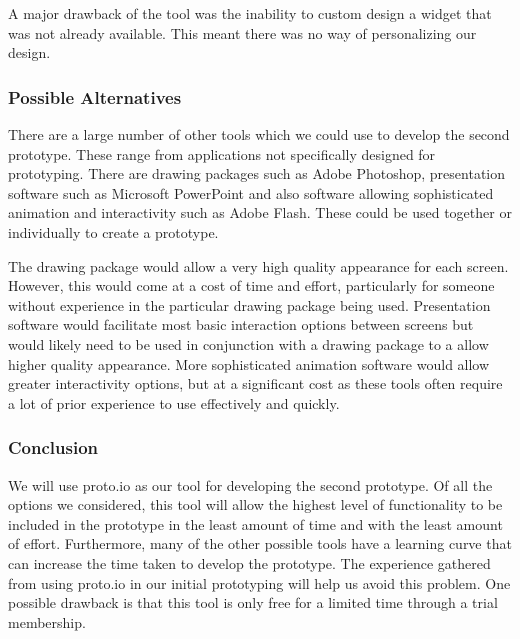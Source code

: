 A major drawback of the tool was the inability to custom design a widget that
was not already available.  This meant there was no way of personalizing our
design.

\subsubsection{Possible Alternatives}

There are a large number of other tools which we could use to develop the
second prototype. These range from applications not specifically designed for
prototyping. There are drawing packages such as Adobe Photoshop, presentation
software such as Microsoft PowerPoint and also software allowing sophisticated
animation and interactivity such as Adobe Flash. These could be used together
or individually to create a prototype.

The drawing package would allow a very high quality appearance for each screen.
However, this would come at a cost of time and effort, particularly for someone
without experience in the particular drawing package being used. Presentation
software would facilitate most basic interaction options between screens but
would likely need to be used in conjunction with a drawing package to a allow
higher quality appearance. More sophisticated animation software would allow
greater interactivity options, but at a significant cost as these tools often
require a lot of prior experience to use effectively and quickly.

\subsubsection{Conclusion}

We will use proto.io as our tool for developing the second prototype. Of all
the options we considered, this tool will allow the highest level of
functionality to be included in the prototype in the least amount of time and
with the least amount of effort. Furthermore, many of the other possible tools
have a learning curve that can increase the time taken to develop the
prototype. The experience gathered from using proto.io in our initial
prototyping will help us avoid this problem. One possible drawback is that this
tool is only free for a limited time through a trial membership.

\restoregeometry%
